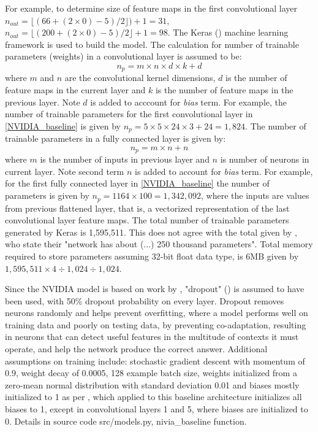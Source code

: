 For example, to determine size of feature maps in the first convolutional layer $n_{out}=\lfloor(66+(2\times0)-5)/2\rfloor)+1=31$, $n_{out}=\lfloor(200+(2\times0)-5)/2\rfloor+1=98$. The Keras (\cite{chollet2015keras}) machine learning framework is used to build the model. The calculation for number of trainable parameters (weights) in a convolutional layer is assumed to be:
\begin{equation}
    \label{eq:feature_map}
    n_p= m \times n \times  d \times k + d
\end{equation}
where $m$ and $n$ are the convolutional kernel dimensions, $d$ is the number of feature maps in the current layer and $k$ is the number of feature maps in the previous layer. Note $d$ is added to acccount for \textit{bias} term. For example, the number of trainable parameters for the first convolutional layer in \ref{NVIDIA_baseline} is given by $n_p = 5 \times 5 \times 24 \times 3 + 24 = 1,824$. The number of trainable parameters in a fully connected layer is given by:
\begin{equation}
    \label{eq:feature_map}
    n_p= m \times n + n
\end{equation}
where $m$ is the number of inputs in previous layer and $n$ is number of neurons in current layer. Note second term $n$ is added to account for \textit{bias} term. For example, for the first fully connected layer in \ref{NVIDIA_baseline} the number of parameters is given by $n_p = 1164 \times 100 = 1,342,092$, where the inputs are values from previous flattened layer, that is, a vectorized representation of the last convolutional layer feature maps.  
The total number of trainable parameters generated by Keras is 1,595,511. This does not agree with the total given by \cite{bojarski2016end}, who state their "network  has  about (...) 250 thousand parameters". Total memory required to store parameters assuming 32-bit float data type, is 6MB given by $1,595,511 \times 4 \div 1,024 \div 1,024$.

Since the NVIDIA model is based on work by \cite{krizhevsky2012imagenet}, "dropout" (\cite{hinton2012improving}) is assumed to have been used, with 50\% dropout probability on every layer.  
Dropout removes neurons randomly and helps prevent overfitting, where a model performs well on training data and poorly on testing data, by preventing co-adaptation, resulting in neurons that can detect useful features in the multitude of contexts it must operate, and help the network produce the correct answer.
Additional assumptions on training include: stochastic gradient descent with momentum of 0.9, weight decay of 0.0005, 128 example batch size, weights initialized from a zero-mean normal distribution with standard deviation 0.01 and biases mostly initialized to 1 as per \cite{krizhevsky2012imagenet}, which applied to this baseline architecture initializes all biases to 1, except in convolutional layers 1 and 5, where biases are initialized to 0. Details in source code src/models.py, nivia\_baseline function.

